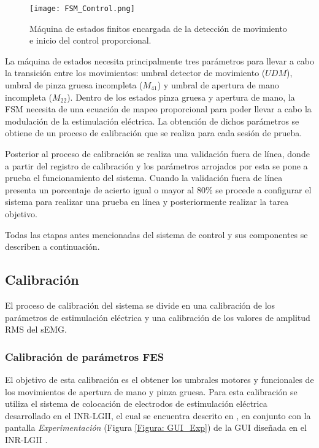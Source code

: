 \begin{figure}[htbp]
	\centering
	\texttt{[image: FSM\_Control.png]}
	\caption[FSM para control]{Máquina de estados finitos encargada de la detección de movimiento e inicio del control proporcional.}
	\label{Figura: FSM_Control}
\end{figure}

La máquina de estados necesita principalmente tres parámetros para llevar a cabo la transición entre los movimientos: umbral detector de movimiento ($UDM$), umbral de pinza gruesa incompleta ($M_{41}$) y umbral de apertura de mano incompleta ($M_{22}$). Dentro de los estados pinza gruesa y apertura de mano, la FSM necesita de una ecuación de mapeo proporcional para poder llevar a cabo la modulación de la estimulación eléctrica. La obtención de dichos parámetros se obtiene de un proceso de calibración que se realiza para cada sesión de prueba.

Posterior al proceso de calibración se realiza una validación fuera de línea, donde a partir del registro de calibración y los parámetros arrojados por esta se pone a prueba el funcionamiento del sistema. Cuando la validación fuera de línea presenta un porcentaje de acierto igual o mayor al 80$\%$ se procede a configurar el sistema para realizar una prueba en línea y posteriormente realizar la tarea objetivo.

Todas las etapas antes mencionadas del sistema de control y sus componentes se describen a continuación.

\subsection{Calibración}\label{Sec: Calibracion}
El proceso de calibración del sistema se divide en una calibración de los parámetros de estimulación eléctrica y una calibración de los valores de amplitud RMS del sEMG.

\subsubsection{Calibración de parámetros FES}\label{Sec:CalFES}
El objetivo de esta calibración es el obtener los umbrales motores y funcionales de los movimientos de apertura de mano y pinza gruesa. Para esta calibración se utiliza el sistema de colocación de electrodos de estimulación eléctrica desarrollado en el INR-LGII, el cual se encuentra descrito en \cite{AnaMartin2019}, en conjunto con la pantalla \emph{Experimentación} (Figura \ref{Figura: GUI_Exp}) de la GUI diseñada en el INR-LGII \cite{JanethFuentes2018}.

